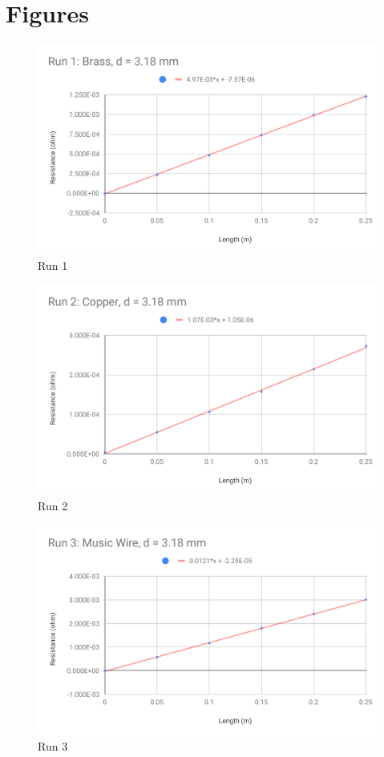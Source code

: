 \section{Figures}
%
\begin{figure}[ht]
	\centering
	\includegraphics[scale=0.74]{image/02-resistance/run1.pdf}
	\caption{Run 1}
	\label{figure.02.run.1}
\end{figure}
%
\begin{figure}[ht]
	\centering
	\includegraphics[scale=0.74]{image/02-resistance/run2.pdf}
	\caption{Run 2}
	\label{figure.02.run.2}
\end{figure}
%
\begin{figure}[ht]
	\centering
	\includegraphics[scale=0.74]{image/02-resistance/run3.pdf}
	\caption{Run 3}
	\label{figure.02.run.3}
\end{figure}
